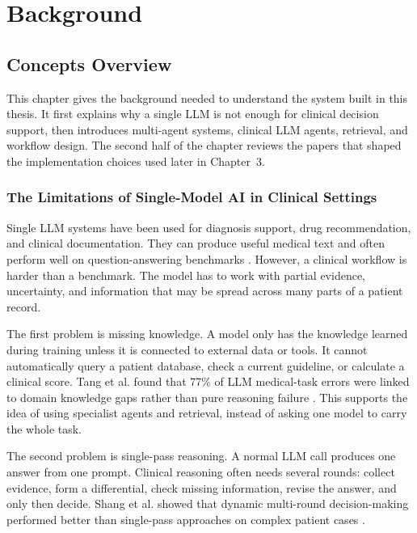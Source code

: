\chapter{Background}
\label{chap:background}

\FloatBarrier
\section{Concepts Overview}
\label{sec:concepts}

This chapter gives the background needed to understand the system built in this
thesis. It first explains why a single LLM is not enough for clinical decision
support, then introduces multi-agent systems, clinical LLM agents, retrieval, and
workflow design. The second half of the chapter reviews the papers that shaped
the implementation choices used later in Chapter~3.

\FloatBarrier
\subsection{The Limitations of Single-Model AI in Clinical Settings}
\label{subsec:single_model_limits}

Single LLM systems have been used for diagnosis support, drug recommendation, and
clinical documentation. They can produce useful medical text and often perform
well on question-answering benchmarks \cite{Abbasian2024openCHA}. However, a
clinical workflow is harder than a benchmark. The model has to work with partial
evidence, uncertainty, and information that may be spread across many parts of a
patient record.

The first problem is missing knowledge. A model only has the knowledge learned
during training unless it is connected to external data or tools. It cannot
automatically query a patient database, check a current guideline, or calculate a
clinical score. Tang et al. found that 77\% of LLM medical-task errors were
linked to domain knowledge gaps rather than pure reasoning failure
\cite{Tang2024MedAgents}. This supports the idea of using specialist agents and
retrieval, instead of asking one model to carry the whole task.

The second problem is single-pass reasoning. A normal LLM call produces one
answer from one prompt. Clinical reasoning often needs several rounds: collect
evidence, form a differential, check missing information, revise the answer, and
only then decide. Shang et al. showed that dynamic multi-round decision-making
performed better than single-pass approaches on complex patient cases
\cite{Shang2025DynamiCare}.

